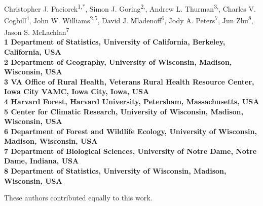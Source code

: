 \documentclass[10pt,letterpaper]{article}
\date{}
\begin{document}
\vspace*{0.35in}

\begin{flushleft}
{\Large
\textbf{}
}
\newline
\\
Christopher J. Paciorek\textsuperscript{1,*},
Simon J. Goring\textsuperscript{2,\Yinyang},
Andrew L. Thurman\textsuperscript{3,\Yinyang},
Charles V. Cogbill\textsuperscript{4},
John W. Williams\textsuperscript{2,5},
David J. Mladenoff\textsuperscript{6},
Jody A. Peters\textsuperscript{7},
Jun Zhu\textsuperscript{8},
Jason S. McLachlan\textsuperscript{7}
\\
\bigskip
\bf{1} Department of Statistics, University of California, Berkeley, California,
USA
\\
\bf{2} Department of Geography, University of Wisconsin, Madison, Wisconsin,
USA
\\
\bf{3} VA Office of Rural Health, Veterans Rural Health Resource Center, Iowa City VAMC, Iowa City, Iowa, USA
\\
\bf{4} Harvard Forest, Harvard University, Petersham, Massachusetts, USA
\\
\bf{5} Center for Climatic Research, University of Wisconsin, Madison,
Wisconsin, USA
\\
\bf{6} Department of Forest and Wildlife Ecology, University of Wisconsin,
Madison, Wisconsin, USA
\\
\bf{7} Department of Biological Sciences, University of Notre Dame, Notre
Dame, Indiana, USA
\\
\bf{8} Department of Statistics, University of Wisconsin, Madison, Wisconsin,
USA
\\
\bigskip

% 
%
\Yinyang These authors contributed equally to this work.




\end{flushleft}
\end{document}
